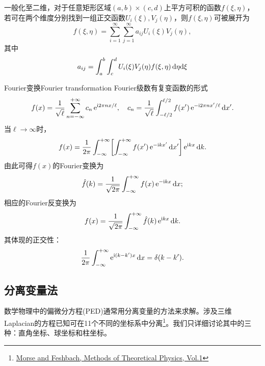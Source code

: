 一般化至二维，对于任意矩形区域$(a,b)\times(c,d)$上平方可积的函数$f(\xi,\eta)$，若可在两个维度分别找到一组正交函数$U_i(\xi),V_j(\eta)$，则$f(\xi,\eta)$可被展开为
\[
    f(\xi,\eta)=\sum_{i=1}^\infty\sum_{j=1}^\infty a_{ij}U_i(\xi)V_j(\eta),
\]
其中 
\[
    a_{ij}=\int_a^b\int_c^dU_i(\xi)V_j(\eta)f(\xi,\eta)\mathop{}\!\mathrm{d}\eta\mathrm{d}\xi
\]
\begin{example}{Fourier变换}{Fourier transformation}
    Fourier级数有复变函数的形式
    \[
        f(x)=\frac1{\sqrt\ell}\sum_{n=-\infty}^{+\infty}c_n\mathop{}\!\mathrm{e}^{\mathrm{i}2\pi nx/\ell},\quad c_n=\frac1{\sqrt\ell}\int_{-\ell/2}^{\ell/2}f(x')\mathop{}\!\mathrm{e}^{-\mathrm{i}2\pi nx'/\ell}\mathop{}\!\mathrm{d} x'.
    \]
    当$\ell\to\infty$时，
    \[
        f(x)=\frac1{2\pi}\int_{-\infty}^{+\infty}\biggl[\int_{-\infty}^{+\infty} f(x')\mathop{}\!\mathrm{e}^{-\mathrm{i} kx'}\mathop{}\!\mathrm{d} x'\biggr]\mathop{}\!\mathrm{e}^{\mathrm{i} kx}\mathop{}\!\mathrm{d} k.
    \]
    由此可得$f(x)$的Fourier变换为
    \begin{equation}
        \hat f(k)=\frac1{\sqrt{2\pi}}\int_{-\infty}^{+\infty} f(x)\mathop{}\!\mathrm{e}^{-\mathrm{i} kx}\mathop{}\!\mathrm{d} x;
    \end{equation}
    相应的Fourier反变换为
    \begin{equation}
        f(x)=\frac1{\sqrt{2\pi}}\int_{-\infty}^{+\infty}\hat f(k)\mathop{}\!\mathrm{e}^{\mathrm{i} kx}\mathop{}\!\mathrm{d} k.
    \end{equation}
    其体现的正交性：
    \[
        \frac1{2\pi}\int_{-\infty}^{+\infty}\mathop{}\!\mathrm{e}^{\mathrm{i}(k-k')x}\mathop{}\!\mathrm{d} x=\delta(k-k').
    \]
\end{example}

\subsection{分离变量法}
\label{ssec:separation of variables}

数学物理中的偏微分方程(PED)通常用分离变量的方法来求解。涉及三维Laplacian的方程已知可在11个不同的坐标系中分离\footnote{\href{https://www.researchgate.net/publication/316991519_Morse_and_Feshbach's_Methods_of_Theoretical_Physics_Vol1_Morse_and_Feshbach_1953}{Morse and Feshbach, Methods of Theoretical Physics, Vol.1}}。我们只详细讨论其中的三种：直角坐标、球坐标和柱坐标。

